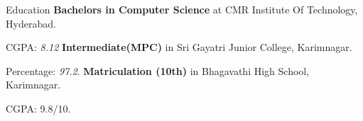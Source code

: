 \begin{rubric}{Education}
\entry*[2020 -- 2024]%
\textbf{Bachelors in Computer Science} at CMR Institute Of Technology, Hyderabad.
	\par CGPA: \emph{8.12}
%
\entry*[2018 -- 2020]%
	\textbf{Intermediate(MPC)} in Sri Gayatri Junior College, Karimnagar.\par
	Percentage: \emph{97.2}.
% 
\entry*[2017 -- 2018]%
	\textbf{Matriculation (10th)} in Bhagavathi High School, Karimnagar.\par
	CGPA: {9.8/10}.
\end{rubric}
